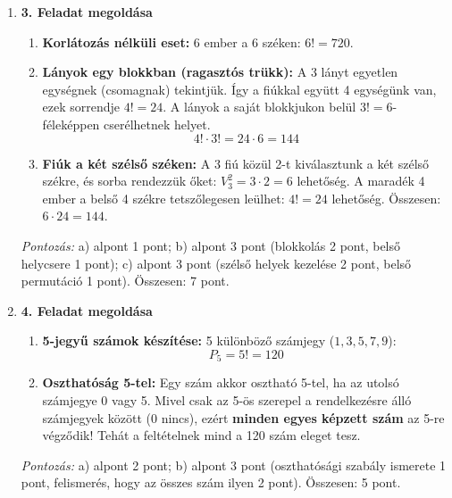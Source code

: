 \documentclass[12pt,a4paper]{article}
\begin{document}
\begin{enumerate}[label=\arabic*., leftmargin=*]
    \vspace{0.4cm}

    \item \textbf{3. Feladat megoldása}
    \begin{enumerate}[label=\alph*)]
        \item \textbf{Korlátozás nélküli eset:} 6 ember a 6 széken: $6! = 720$.
        \item \textbf{Lányok egy blokkban (ragasztós trükk):} 
        A 3 lányt egyetlen egységnek (csomagnak) tekintjük. Így a fiúkkal együtt 4 egységünk van, ezek sorrendje $4! = 24$. A lányok a saját blokkjukon belül $3! = 6$-féleképpen cserélhetnek helyet.
        \begin{equation*}
            4! \cdot 3! = 24 \cdot 6 = 144
        \end{equation*}
        \item \textbf{Fiúk a két szélső széken:} 
        A 3 fiú közül 2-t kiválasztunk a két szélső székre, és sorba rendezzük őket: $V_3^2 = 3 \cdot 2 = 6$ lehetőség. A maradék 4 ember a belső 4 székre tetszőlegesen leülhet: $4! = 24$ lehetőség. Összesen: $6 \cdot 24 = 144$.
    \end{enumerate}
    \textit{Pontozás:} a) alpont 1 pont; b) alpont 3 pont (blokkolás 2 pont, belső helycsere 1 pont); c) alpont 3 pont (szélső helyek kezelése 2 pont, belső permutáció 1 pont). Összesen: 7 pont.

    \vspace{0.4cm}

    \item \textbf{4. Feladat megoldása}
    \begin{enumerate}[label=\alph*)]
        \item \textbf{5-jegyű számok készítése:} 5 különböző számjegy ($1, 3, 5, 7, 9$):
        \begin{equation*}
            P_5 = 5! = 120
        \end{equation*}
        \item \textbf{Oszthatóság 5-tel:} 
        Egy szám akkor osztható 5-tel, ha az utolsó számjegye 0 vagy 5. Mivel csak az 5-ös szerepel a rendelkezésre álló számjegyek között (0 nincs), ezért \textbf{minden egyes képzett szám} az 5-re végződik! 
        Tehát a feltételnek mind a 120 szám eleget tesz.
    \end{enumerate}
    \textit{Pontozás:} a) alpont 2 pont; b) alpont 3 pont (oszthatósági szabály ismerete 1 pont, felismerés, hogy az összes szám ilyen 2 pont). Összesen: 5 pont.


\end{enumerate}
\end{document}
